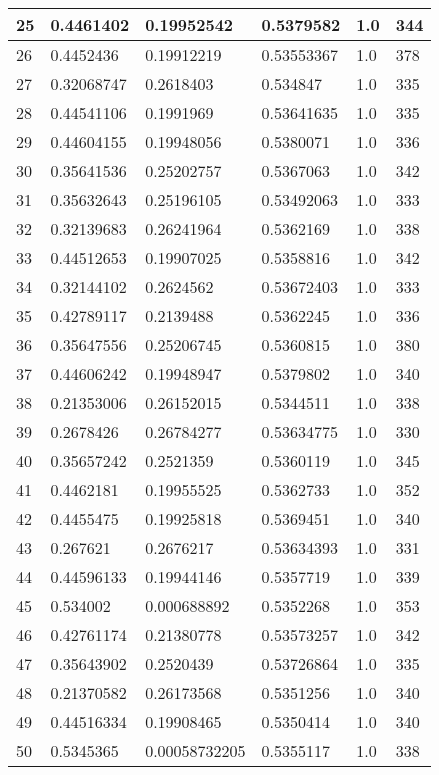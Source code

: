 \begin{longtable}{|l|l|l|l|l|l|}
25 & 0.4461402 & 0.19952542 & 0.5379582 & 1.0 & 344 \\ \hline 
26 & 0.4452436 & 0.19912219 & 0.53553367 & 1.0 & 378 \\ \hline 
27 & 0.32068747 & 0.2618403 & 0.534847 & 1.0 & 335 \\ \hline 
28 & 0.44541106 & 0.1991969 & 0.53641635 & 1.0 & 335 \\ \hline 
29 & 0.44604155 & 0.19948056 & 0.5380071 & 1.0 & 336 \\ \hline 
30 & 0.35641536 & 0.25202757 & 0.5367063 & 1.0 & 342 \\ \hline 
31 & 0.35632643 & 0.25196105 & 0.53492063 & 1.0 & 333 \\ \hline 
32 & 0.32139683 & 0.26241964 & 0.5362169 & 1.0 & 338 \\ \hline 
33 & 0.44512653 & 0.19907025 & 0.5358816 & 1.0 & 342 \\ \hline 
34 & 0.32144102 & 0.2624562 & 0.53672403 & 1.0 & 333 \\ \hline 
35 & 0.42789117 & 0.2139488 & 0.5362245 & 1.0 & 336 \\ \hline 
36 & 0.35647556 & 0.25206745 & 0.5360815 & 1.0 & 380 \\ \hline 
37 & 0.44606242 & 0.19948947 & 0.5379802 & 1.0 & 340 \\ \hline 
38 & 0.21353006 & 0.26152015 & 0.5344511 & 1.0 & 338 \\ \hline 
39 & 0.2678426 & 0.26784277 & 0.53634775 & 1.0 & 330 \\ \hline 
40 & 0.35657242 & 0.2521359 & 0.5360119 & 1.0 & 345 \\ \hline 
41 & 0.4462181 & 0.19955525 & 0.5362733 & 1.0 & 352 \\ \hline 
42 & 0.4455475 & 0.19925818 & 0.5369451 & 1.0 & 340 \\ \hline 
43 & 0.267621 & 0.2676217 & 0.53634393 & 1.0 & 331 \\ \hline 
44 & 0.44596133 & 0.19944146 & 0.5357719 & 1.0 & 339 \\ \hline 
45 & 0.534002 & 0.000688892 & 0.5352268 & 1.0 & 353 \\ \hline 
46 & 0.42761174 & 0.21380778 & 0.53573257 & 1.0 & 342 \\ \hline 
47 & 0.35643902 & 0.2520439 & 0.53726864 & 1.0 & 335 \\ \hline 
48 & 0.21370582 & 0.26173568 & 0.5351256 & 1.0 & 340 \\ \hline 
49 & 0.44516334 & 0.19908465 & 0.5350414 & 1.0 & 340 \\ \hline 
50 & 0.5345365 & 0.00058732205 & 0.5355117 & 1.0 & 338 \\ \hline 
\end{longtable}